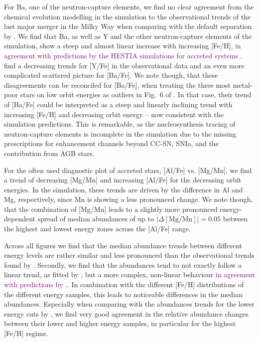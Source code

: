 \documentclass[fleqn,usenatbib]{mnras}
\newcommand{\changed}[1]{{\textcolor{purple}{#1}}}
\begin{document}
For Ba, one of the neutron-capture elements, we find no clear agreement from the chemical evolution modelling in the simulation to the observational trends of the last major merger in the Milky Way when comparing with the default separation by \citet[][their Fig.~6]{Skuladottir2025}. We find that Ba, as well as Y and the other neutron-capture elements of the simulation, show a steep and almost linear increase with increasing [Fe/H]\changed{, in agreement with predictions by the HESTIA simulations for accreted systems \citep{Khoperskov2023c}}. \citet{Skuladottir2025} find a decreasing trends for [Y/Fe] in the observational data and an even more complicated scattered picture for [Ba/Fe]. We note though, that these disagreements can be reconciled for [Ba/Fe], when treating the three most metal-poor stars on low orbit energies as outliers in Fig.~6 of \citet{Skuladottir2025}. In that case, their trend of [Ba/Fe] could be interpreted as a steep and linearly inclining trend with increasing [Fe/H] and decreasing orbit energy -- now consistent with the simulation predictions. This is remarkable, as the nucleosynthesis tracing of neutron-capture elements is incomplete in the simulation due to the missing prescriptions for enhancement channels beyond CC-SN, SNIa, and the contribution from AGB stars.

For the often used diagnostic plot of accreted stars, [Al/Fe] vs. [Mg/Mn], we find a trend of decreasing [Mg/Mn] and increasing [Al/Fe] for the decreasing orbit energies. In the simulation, these trends are driven by the difference in Al and Mg, respectively, since Mn is showing a less pronounced change. We note though, that the combination of [Mg/Mn] leads to a slightly more pronounced energy-dependent spread of median abundances of up to $\vert\Delta\mathrm{[Mg/Mn]}\vert = 0.05$ between the highest and lowest energy zones across the [Al/Fe] range.

Across all figures we find that the median abundance trends between different energy levels are rather similar and less pronounced than the observational trends found by \citet{Skuladottir2025}. Secondly, we find that the abundances tend to not exactly follow a linear trend, as fitted by \citet{Skuladottir2025}, but a more complex, non-linear behaviour \changed{in agreement with predictions by \citet{Khoperskov2023c}.}. In combination with the different [Fe/H] distributions of the different energy samples, this leads to noticeable differences in the median abundances. Especially when comparing with the abundances trends for the lower energy cuts by \citet[][their Fig.~5]{Skuladottir2025}, we find very good agreement in the relative abundance changes between their lower and higher energy samples, in particular for the highest [Fe/H] regime.
\end{document}
